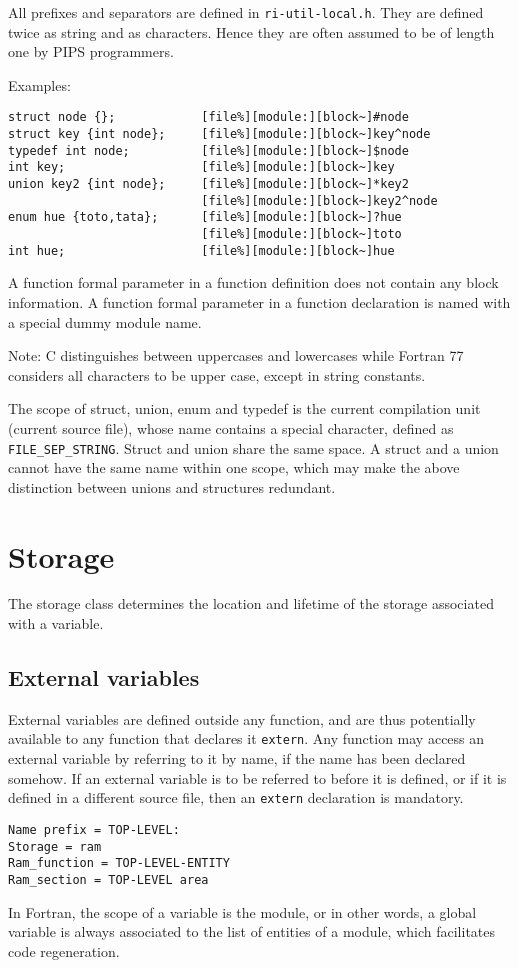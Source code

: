 \documentclass[a4paper]{report}
\begin{document}
All prefixes and separators are defined in
\verb/ri-util-local.h/. They are defined twice as string and as
characters. Hence they are often assumed to be of length one by PIPS
programmers.

Examples: 
\begin{verbatim}
struct node {};            [file%][module:][block~]#node
struct key {int node};     [file%][module:][block~]key^node 
typedef int node;          [file%][module:][block~]$node
int key;                   [file%][module:][block~]key
union key2 {int node};     [file%][module:][block~]*key2 
                           [file%][module:][block~]key2^node 
enum hue {toto,tata};      [file%][module:][block~]?hue
                           [file%][module:][block~]toto 
int hue;                   [file%][module:][block~]hue
\end{verbatim}   

A function formal parameter in a function definition does not contain
 any block information. A function formal parameter in a function
 declaration is named with a special dummy module name.


Note: C distinguishes between uppercases and lowercases while Fortran
 77 considers all characters to be upper case, except in string
 constants.
 
The scope of struct, union, enum and typedef is the current
 compilation unit (current source file), whose name contains a special
 character, defined as \verb/FILE_SEP_STRING/. Struct and union share
 the same space. A struct and a union cannot have the same name within
 one scope, which may make the above distinction between unions and
 structures redundant.
 

\chapter{Storage}
\label{chapter:storage}

The storage class determines the location and lifetime of the storage
associated with a variable. 

\section{External variables}

\label{external}
External variables are defined outside any function, and are thus
 potentially available to any function that declares it
 \verb/extern/. Any function may access an external variable by
 referring to it by name, if the name has been declared somehow. If an
 external variable is to be referred to before it is defined, or if it
 is defined in a different source file, then an \verb/extern/
 declaration is mandatory.
\begin{verbatim}
Name prefix = TOP-LEVEL:
Storage = ram 
Ram_function = TOP-LEVEL-ENTITY 
Ram_section = TOP-LEVEL area 
\end{verbatim}
In Fortran, the scope of a variable is the module, or in other words, 
a global variable is always associated to the list of entities
of a module, which facilitates code regeneration. 
\end{document}
